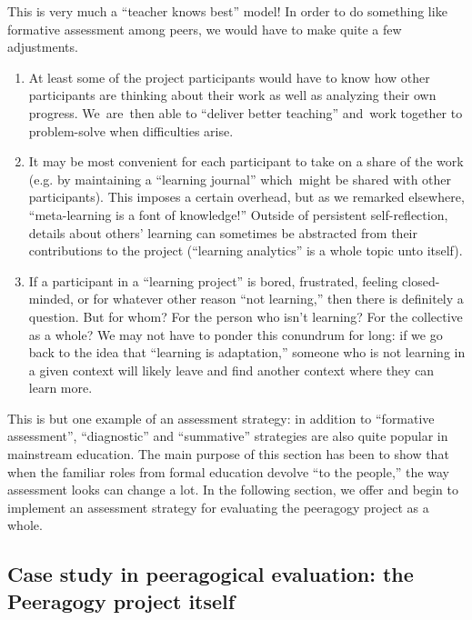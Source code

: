 This is very much a ``teacher knows best'' model! In order to do
something like formative assessment among peers, we would have to make
quite a few adjustments.

\begin{enumerate}
\itemsep1pt\parskip0pt
\item
  At least some of the project participants would have to know how other
  participants are thinking about their work as well as analyzing their
  own progress. We~are~then able to ``deliver better teaching'' and~work
  together to problem-solve when difficulties arise.
\item
  It may be most convenient for each participant to take on a share of
  the work (e.g. by maintaining a ``learning journal'' which~might be
  shared with other participants). This imposes a certain overhead, but
  as we remarked elsewhere, ``meta-learning is a font of knowledge!''
  Outside of persistent self-reflection, details about others' learning
  can sometimes be abstracted from their contributions to the project
  (``learning analytics'' is a whole topic unto itself).
\item
  If a participant in a ``learning project'' is bored, frustrated,
  feeling closed-minded, or for whatever other reason ``not learning,''
  then there is definitely a question. But for whom? For the person who
  isn't learning? For the collective as a whole? We may not have to
  ponder this conundrum for long: if we go back to the idea that
  ``learning is adaptation,'' someone who is not learning in a given
  context will likely leave and find another context where they can
  learn more.
\end{enumerate}

This is but one example of an assessment strategy: in addition to
``formative assessment'', ``diagnostic'' and ``summative'' strategies
are also quite popular in mainstream education. The main purpose of this
section has been to show that when the familiar roles from formal
education devolve ``to the people,'' the way assessment looks can change
a lot. In the following section, we offer and begin to implement an
assessment strategy for evaluating the peeragogy project as a whole.

\subsection{Case study in peeragogical evaluation: the Peeragogy project
itself}

